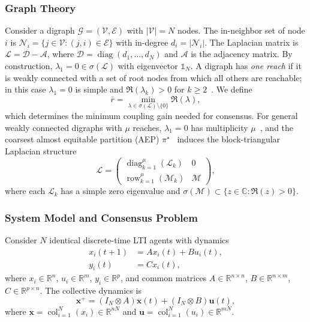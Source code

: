 \documentclass[12pt]{elsarticle}
\theoremstyle{remark}
\DeclareMathOperator{\diag}{diag}
\DeclareMathOperator{\col}{col}
\DeclareMathOperator{\row}{row}
\newcommand{\R}{\mathbb{R}}
\newcommand{\C}{\mathbb{C}}
\newcommand{\ones}{\mathbb{1}}
\newcommand{\bx}{\boldsymbol{x}}
\newcommand{\bu}{\boldsymbol{u}}
\begin{document}
\subsubsection{Graph Theory}
\label{subsec:graphs}

Consider a digraph $\mathcal{G} = (\mathcal{V}, \mathcal{E})$ with $|\mathcal{V}| = N$ nodes. The in-neighbor set of node $i$ is $\mathcal{N}_i = \{j \in \mathcal{V} : (j,i) \in \mathcal{E}\}$ with in-degree $d_i = |\mathcal{N}_i|$. The Laplacian matrix is $\mathcal{L} = \mathcal{D} - \mathcal{A}$, where $\mathcal{D} = \diag(d_1, \ldots, d_N)$ and $\mathcal{A}$ is the adjacency matrix. By construction, $\lambda_1 = 0 \in \sigma(\mathcal{L})$ with eigenvector $\ones_N$. A digraph has \emph{one reach} if it is weakly connected with a set of root nodes from which all others are reachable; in this case $\lambda_1 = 0$ is simple and $\Re(\lambda_k) > 0$ for $k \geq 2$~\cite{caughman2006}. We define
\begin{equation}
\bar{r} = \min_{\lambda \in \sigma(\mathcal{L}) \setminus \{0\}} \Re(\lambda),
\label{eq:rbar}
\end{equation}
which determines the minimum coupling gain needed for consensus. For general weakly connected digraphs with $\mu$ reaches, $\lambda_1 = 0$ has multiplicity $\mu$~\cite{caughman2006}, and the coarsest almost equitable partition (AEP) $\pi^\star$~\cite{monaco2019} induces the block-triangular Laplacian structure
\begin{equation}
\mathcal{L} = \begin{pmatrix} \diag_{k=1}^{\mu}(\mathcal{L}_k) & 0 \\ \row_{k=1}^{\mu}(\mathcal{M}_k) & \mathcal{M} \end{pmatrix},
\label{eq:L_block}
\end{equation}
where each $\mathcal{L}_k$ has a simple zero eigenvalue and $\sigma(\mathcal{M}) \subset \{z \in \C : \Re(z) > 0\}$.

\subsubsection{System Model and Consensus Problem}
\label{subsec:system}

Consider $N$ identical discrete-time LTI agents with dynamics
\begin{align}
x_i(t+1) &= A x_i(t) + B u_i(t), \label{eq:agent_state} \\
y_i(t) &= C x_i(t), \label{eq:agent_output}
\end{align}
where $x_i \in \R^n$, $u_i \in \R^m$, $y_i \in \R^p$, and common matrices $A \in \R^{n \times n}$, $B \in \R^{n \times m}$, $C \in \R^{p \times n}$. The collective dynamics is
\begin{equation}
\bx^+ = (I_N \otimes A)\bx(t) + (I_N \otimes B)\bu(t),
\label{eq:collective}
\end{equation}
where $\bx = \col_{i=1}^N(x_i) \in \R^{nN}$ and $\bu = \col_{i=1}^N(u_i) \in \R^{mN}$.
\end{document}
